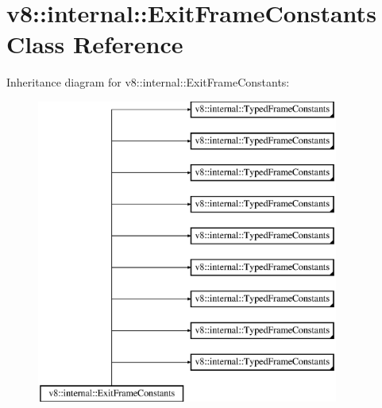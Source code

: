 \hypertarget{classv8_1_1internal_1_1_exit_frame_constants}{}\section{v8\+:\+:internal\+:\+:Exit\+Frame\+Constants Class Reference}
\label{classv8_1_1internal_1_1_exit_frame_constants}
Inheritance diagram for v8\+:\+:internal\+:\+:Exit\+Frame\+Constants\+:\begin{figure}[H]
\begin{center}
\leavevmode
\includegraphics[height=10.000000cm]{classv8_1_1internal_1_1_exit_frame_constants}
\end{center}
\end{figure}
